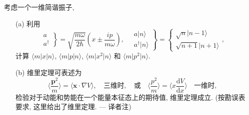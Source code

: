 \documentclass{assignment}
\begin{document}
\begin{prob}[课本习题 2.14]
    考虑一个一维简谐振子,
    \begin{itemize}
        \item[(a)] 利用
        \[
            \left.\begin{array}{l}
                a\\
                a^{\dagger}
            \end{array}\right\}=\sqrt{\frac{m\omega}{2\hbar}}\left(x\pm\frac{ip}{m\omega}\right),\quad\left.\begin{array}{l}
                a\lvert n\rangle\\
                a^{\dagger}\lvert n\rangle
            \end{array}\right\}=\left\{\begin{array}{l}
                \sqrt{n}\lvert n-1\rangle\\
                \sqrt{n+1}\lvert n+1\rangle
            \end{array}\right.,
        \]
        计算 $\langle m\rvert x\lvert n\rangle$, $\langle m\rvert p\lvert n\rangle$, $\langle m\rvert x^2\lvert n\rangle$ 和 $\langle m\rvert p^2\lvert n\rangle$.
        \item[(b)] 维里定理可表述为
        \[
            \langle\frac{\bm{p}^2}{m}\rangle=\langle\bm{x}\cdot\nabla V\rangle,\quad\text{三维时},\quad\text{或}\quad\langle\frac{p^2}{m}\rangle=\langle x\frac{\mathrm{d}V}{\mathrm{d}x}\rangle\quad\text{一维时},
        \]
        检验对于动能和势能在一个能量本征态上的期待值, 维里定理成立. (按勘误表要求, 这里给出了维里定理. --- 译者注)
    \end{itemize}
\end{prob}
\end{document}
